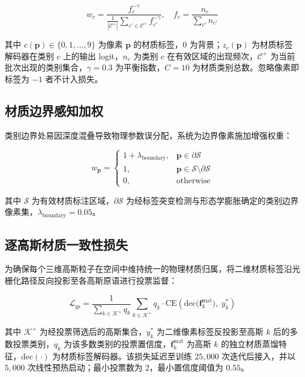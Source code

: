 \begin{equation}
w_c = \frac{f_c^{-\gamma}}{\frac{1}{|\mathcal{C}^+|}\sum_{c' \in \mathcal{C}^+} f_{c'}^{-\gamma}}, \quad f_c = \frac{n_c}{\sum_{c'} n_{c'}}
\label{eq:class_balance}
\end{equation}

其中 $c(\mathbf{p}) \in \{0, 1, \dots, 9\}$ 为像素 $\mathbf{p}$ 的材质标签，0 为背景；$z_c(\mathbf{p})$ 为材质标签解码器在类别 $c$ 上的输出 logit，$n_c$ 为类别 $c$ 在有效区域的出现频次，$\mathcal{C}^+$ 为当前批次出现的类别集合，$\gamma = 0.3$ 为平衡指数，$C = 10$ 为材质类别总数。忽略像素即标签为 $-1$ 者不计入损失。

\subsection{材质边界感知加权}

类别边界处易因深度混叠导致物理参数误分配，系统为边界像素施加增强权重：

\begin{equation}
w_{\mathbf{p}} = 
\begin{cases}
1 + \lambda_{\text{boundary}}, & \mathbf{p} \in \partial\mathcal{S} \\[2pt]
1,                              & \mathbf{p} \in \mathcal{S} \setminus \partial\mathcal{S} \\[2pt]
0,                              & \text{otherwise}
\end{cases}
\label{eq:boundary_weight}
\end{equation}

其中 $\mathcal{S}$ 为有效材质标注区域，$\partial\mathcal{S}$ 为经标签突变检测与形态学膨胀确定的类别边界像素集，$\lambda_{\text{boundary}} = 0.05$。

\subsection{逐高斯材质一致性损失}

为确保每个三维高斯粒子在空间中维持统一的物理材质归属，将二维材质标签沿光栅化路径反向投影至各高斯原语进行投票监督：

\begin{equation}
\mathcal{L}_{\text{gs}} = \frac{1}{\sum_{k\in\mathcal{K}^{+}} q_k} \sum_{k \in \mathcal{K}^{+}} q_k \cdot \mathrm{CE}\!\left( \mathrm{dec}\big( \mathbf{f}_k^{\text{mat}} \big),\; y_k^{*} \right)
\label{eq:gs_consistency}
\end{equation}

其中 $\mathcal{K}^{+}$ 为经投票筛选后的高斯集合，$y_k^{*}$ 为二维像素标签反投影至高斯 $k$ 后的多数投票类别，$q_k$ 为该多数类别的投票置信度，$\mathbf{f}_k^{\text{mat}}$ 为高斯 $k$ 的独立材质蒸馏特征，$\mathrm{dec}(\cdot)$ 为材质标签解码器。该损失延迟至训练 $25{,}000$ 次迭代后接入，并以 $5{,}000$ 次线性预热启动；最小投票数为 $2$，最小置信度阈值为 $0.55$。

